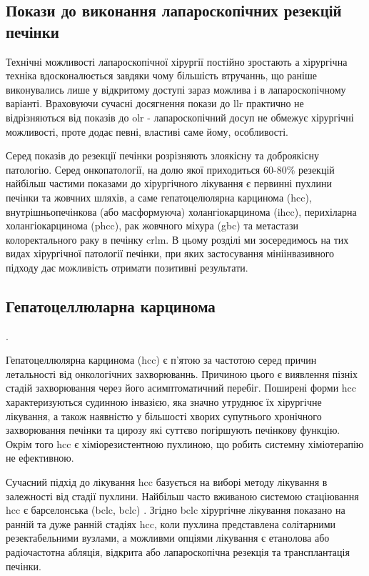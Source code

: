 \begin{refsection}
\section{Покази до виконання лапароскопічних резекцій печінки}

Технічні можливості лапароскопічної хірургії постійно зростають а хірургічна техніка вдосконалюється завдяки чому більшість втручаннь, що раніше виконувались лише у відкритому доступі зараз можлива і в лапароскопічному варіанті. Враховуючи сучасні досягнення покази до \acrshort{llr} практично не відрізняються від показів до \acrshort{olr} - лапароскопічний досуп не обмежує хірургічні можливості, проте додає певні, властиві саме йому, особливості. 

Серед показів до резекції печінки розрізняють злоякісну та доброякісну патологію. Серед онкопатології, на долю якої приходиться 60-80\% резекцій  найбільш частими показами до хірургічного лікування є первинні пухлини печінки та жовчних шляхів, а саме гепатоцелюлярна карцинома (\acrshort{hcc}), внутрішньопечінкова (або масформуюча) холангіокарцинома (\acrshort{ihcc}), перихіларна холангіокарцинома (\acrshort{phcc}), рак жовчного міхура (\acrshort{gbc}) та метастази колоректального раку в печінку \acrshort{crlm}. 
В цьому розділі ми зосередимось на тих видах хірургічної патології печінки, при яких застосування мініінвазивного підходу дає можливість отримати позитивні результати. 

\subsection{Гепатоцеллюларна карцинома}.

Гепатоцеллюлярна карцинома (\acrshort{hcc}) є п'ятою за частотою серед причин летальності від онкологічних захворюваннь. Причиною цього є  виявлення пізніх стадій захворювання через його асимптоматичний перебіг. Поширені форми \acrshort{hcc} характеризуються судинною інвазією, яка значно утруднює їх хірургічне лікування, а також наявністю у більшості хворих супутнього хронічного захворювання печінки та цирозу які суттєво погіршують печінкову функцію. Окрім того \acrshort{hcc} є хіміорезистентною пухлиною, що робить системну хіміотерапію не ефективною.

Сучасний підхід до лікування \acrshort{hcc} базується на виборі методу лікування в залежності від стадії пухлини. Найбільш часто вживаною системою стаціювання \acrshort{hcc} є барселонська (\acrfull{bclc}, \acrshort{bclc}) \cite{Llovet2003}. Згідно \acrshort{bclc} хірургічне лікування показано на ранній та дуже ранній стадіях \acrshort{hcc}, коли пухлина представлена солітарними резектабельними вузлами, а можливми опціями лікування є етанолова або радіочастотна абляція, відкрита або лапароскопічна резекція та трансплантація печінки. 


\end{refsection}
